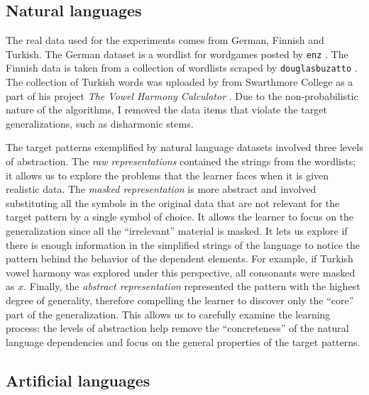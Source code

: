 \subsection{Natural languages}

The real data used for the experiments comes from German, Finnish and Turkish.
The German dataset is a wordlist for wordgames posted by \texttt{enz} \href{https://github.com/enz/german-wordlist}{\faGithub} \citep{GHenz}.
The Finnish data is taken from a collection of wordlists scraped by \texttt{douglasbuzatto} \href{https://github.com/douglasbuzatto/WordLists}{\faGithub} \citep{GHdouglasbuzatto}.
The collection of Turkish words was uploaded by \cite{HarrisonEtAl2004} from Swarthmore College as a part of his project \emph{The Vowel Harmony Calculator} \href{http://www.swarthmore.edu/SocSci/harmony/public_html/dummyresults.html}{\faChain}.
Due to the non-probabilistic nature of the algorithms, I removed the data items that violate the target generalizations, such as disharmonic stems.

The target patterns exemplified by natural language datasets involved three levels of abstraction.
The \emph{raw representations} contained the strings from the wordlists; it allows us to explore the problems that the learner faces when it is given realistic data.
The \emph{masked representation} is more abstract and involved substituting all the symbols in the original data that are not relevant for the target pattern by a single symbol of choice.
It allows the learner to focus on the generalization since all the ``irrelevant'' material is masked.
It lets us explore if there is enough information in the simplified strings of the language to notice the pattern behind the behavior of the dependent elements.
For example, if Turkish vowel harmony was explored under this perspective, all consonants were masked as $x$.
Finally, the \emph{abstract representation} represented the pattern with the highest degree of generality, therefore compelling the learner to discover only the ``core'' part of the generalization.
This allows us to carefully examine the learning process: the levels of abstraction help remove the ``concreteness'' of the natural language dependencies and focus on the general properties of the target patterns.


\subsection{Artificial languages}
\label{secartlang}

